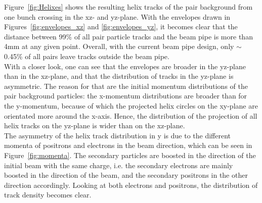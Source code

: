 Figure~\ref{fig:Helixes} shows the resulting helix tracks of the pair background from one bunch crossing in the xz- and yz-plane.
With the envelopes drawn in Figures~\ref{fig:envelopes_xz} and \ref{fig:envelopes_yz}, it becomes clear that the distance between 99\% of all pair particle tracks and the beam pipe is more than \unit{4}{mm} at any given point.
Overall, with the current beam pipe design, only $\sim$ 0.45\% of all pairs leave tracks outside the beam pipe.\\
With a closer look, one can see that the envelopes are broader in the yz-plane than in the xz-plane, and that the distribution of tracks in the yz-plane is asymmetric.
The reason for that are the initial momentum distributions of the pair background particles: the x-momentum distributions are broader than for the y-momentum, because of which the projected helix circles on the xy-plane are orientated more around the x-axis.
Hence, the distribution of the projection of all helix tracks on the yz-plane is wider than on the xz-plane.\\
The asymmetry of the helix track distribution in y is due to the different momenta of positrons and electrons in the beam direction, which can be seen in Figure~\ref{fig:momenta}.
The secondary particles are boosted in the direction of the initial beam with the same charge, i.e. the secondary electrons are mainly boosted in the direction of the \Pem beam, and the secondary positrons in the other direction accordingly.
Looking at both electrons and positrons, the distribution of track density becomes clear.


